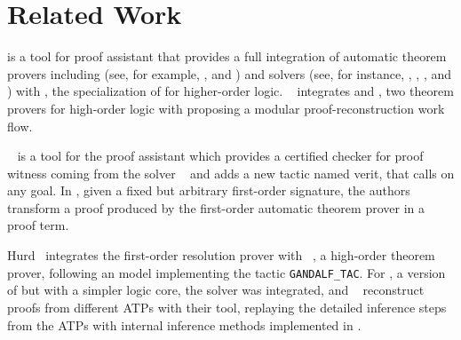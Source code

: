 \documentclass[../main.tex]{subfiles}
\begin{document}

\section{Related Work}
\label{sec:related-work}

 is a tool for  proof assistant
\cite{paulson1994isabelle} that provides a full integration of
automatic theorem provers including \ATPs (see, for example,
\cite{meng2006automation}, \cite{blanchette2013extending} and
\cite{Fleury2014}) and \SMT solvers (see, for instance,
\cite{hurlin07practical}, \cite{bohme2010},
\cite{blanchette2013extending}, and \cite{Fleury2014}) with
 \cite{nipkow2002isabelle}, the specialization of
 for higher-order logic.
\citeauthor{Een2004}~\cite{Een2004} integrates  and
, two theorem provers for high-order logic with
 proposing a modular proof-reconstruction work
flow.

~\cite{armand2011,Ekici2017} is a tool for the
 proof assistant \cite{coqteam} which provides a certified
checker for proof witness coming from the \SMT solver
~\cite{bouton2009} and adds a new tactic named verit,
that calls  on any  goal.
In \cite{bezem2002automated},
given a fixed but arbitrary first-order signature, the authors
transform a proof produced by the first-order automatic theorem
prover  \cite{deNivelle2003} in a  proof
term.

Hurd~\cite{Hurd1999} integrates the first-order resolution prover
 with ~\cite{norrish2007hol}, a high-order
theorem prover, following an  model implementing the
tactic \verb!GANDALF_TAC!. For , a version of
 but with a simpler logic core, the \SMT solver 
was integrated, and \citeauthor{kaliszyk2013}~\cite{kaliszyk2013}
reconstruct proofs from different ATPs with their  tool,
replaying the detailed inference steps from the ATPs with internal
inference methods implemented in .



\end{document}
